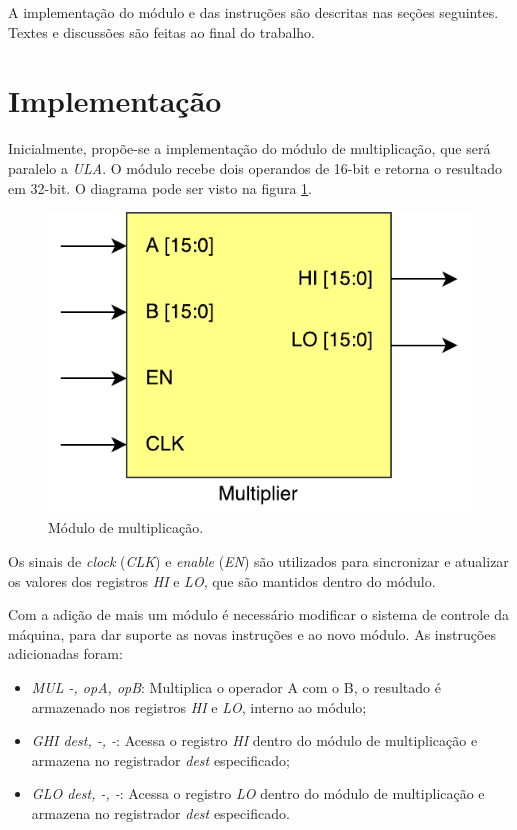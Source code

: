 \documentclass[11pt,a4paper,titlepage]{article}
\begin{document}
A implementação do módulo e das instruções são descritas nas seções seguintes. Textes e discussões são feitas ao final do trabalho.

\section{Implementação}

Inicialmente, propõe-se a implementação do módulo de multiplicação, que será paralelo a \textit{ULA}. O módulo recebe dois operandos de 16-bit e retorna o resultado em 32-bit. O diagrama pode ser visto na figura \ref{fig:mult}.

\begin{figure}[!h]
\centering
\includegraphics[scale=0.5]{images/Multiplier.pdf}
\caption{Módulo de multiplicação.}
\label{fig:mult}
\end{figure}

Os sinais de \textit{clock} (\textit{CLK}) e \textit{enable} (\textit{EN}) são utilizados para sincronizar e atualizar os valores dos registros \textit{HI} e \textit{LO}, que são mantidos dentro do módulo.

Com a adição de mais um módulo é necessário modificar o sistema de controle da máquina, para dar suporte as novas instruções e ao novo módulo. As instruções adicionadas foram:

\begin{itemize}
\item \textit{MUL -, opA, opB}: Multiplica o operador A com o B, o resultado é armazenado nos registros \textit{HI} e \textit{LO}, interno ao módulo;
\item \textit{GHI dest, -, -}: Acessa o registro \textit{HI} dentro do módulo de multiplicação e armazena no registrador \textit{dest} especificado;
\item \textit{GLO dest, -, -}: Acessa o registro \textit{LO} dentro do módulo de multiplicação e armazena no registrador \textit{dest} especificado.
\end{itemize}
\end{document}
